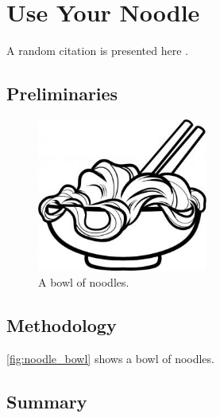 \chapter{Use Your Noodle}
\label{ch:noodle}

A random citation is presented here \cite{schwartz03}.

\lipsum[1]

\section{Preliminaries}

\lipsum[4-5]

\begin{figure}[htbp]
    \centering
    \includegraphics[width=0.5\textwidth]{images/noodle.jpg}
    \caption{A bowl of noodles.}
    \label{fig:noodle_bowl}
\end{figure}

\section{Methodology}

\autoref{fig:noodle_bowl} shows a bowl of noodles. 

\section{Summary}

\lipsum[17]